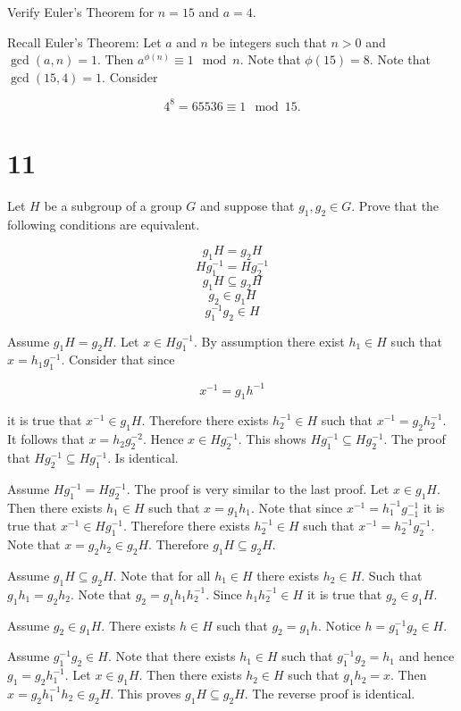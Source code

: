 \documentclass[a4paper]{article}
\begin{document}
Verify Euler's Theorem for $n=15$ and $a=4$.

\vspace{\baselineskip}

Recall Euler's Theorem: Let $a$ and $n$ be integers such that $n > 0$ and $\gcd(a,n) = 1$. Then $a^{\phi(n)} \equiv 1 \mod n$. Note that $\phi(15) = 8$. Note that $\gcd(15, 4) = 1$. Consider

$$4^8 = 65536 \equiv 1 \mod 15.$$


\section*{11}

Let $H$ be a subgroup of a group $G$ and suppose that $g_1, g_2 \in G$. Prove that the following conditions are equivalent.

$$g_1 H = g_2 H$$
$$H g_1^{-1} = H g_2^{-1}$$
$$g_1 H \subseteq g_2 H$$
$$g_2  \in g_1 H$$
$$g_1^{-1} g_2 \in H$$

\vspace{\baselineskip}

Assume $g_1 H = g_2 H$. Let $x \in H g_1^{-1}$. By assumption there exist $h_1 \in H$ such that $x = h_1 g_1^{-1}$. Consider that since

$$x^{-1} = g_1 h^{-1}$$

it is true that $x^{-1} \in g_1 H$. Therefore there exists $h_2^{-1} \in H$ such that $x^{-1} = g_2 h_2^{-1}$. It follows that $x = h_2 g_2^{-2}$. Hence $x \in H g_2^{-1}$. This shows $H g_1^{-1} \subseteq H g_2^{-1}$. The proof that $H g_2^{-1} \subseteq H g_1^{-1}$. Is identical.

Assume $Hg_1^{-1} = Hg_2^{-1}$. The proof is very similar to the last proof. Let $x \in g_1 H$. Then there exists $h_1 \in H$ such that $x = g_1 h_1$. Note that since $x^{-1} = h_1^{-1} g_{-1}^{-1}$ it is true that $x^{-1} \in H g_1^{-1}$. Therefore there exists $h_2^{-1} \in H$ such that $x^{-1} = h_2^{-1} g_2^{-1}$. Note that $x = g_2 h_2 \in g_2 H$. Therefore $g_1 H \subseteq g_2 H$.

Assume $g_1 H \subseteq g_2 H$. Note that for all $h_1 \in H$ there exists $h_2 \in H$. Such that $g_1 h_1 = g_2 h_2$. Note that $g_2 = g_1 h_1 h_2 ^{-1}$. Since $h_1 h_2^{-1} \in H$ it is true that $g_2 \in g_1 H$.

Assume $g_2  \in g_1 H$. There exists $h \in H$ such that $g_2 = g_1 h$. Notice $h = g_1^{-1} g_2 \in H$.

Assume $g_1^{-1} g_2 \in H$. Note that there exists $h_1 \in H$ such that $g_1^{-1} g_2 = h_1$ and hence $g_1 = g_2 h_1^{-1}$. Let $x \in g_1 H$. Then there exists $h_2 \in H$ such that $g_1 h_2 = x$. Then $x = g_2 h_1^{-1} h_2 \in g_2 H$. This proves $g_1 H \subseteq g_2 H$. The reverse proof is identical.
\end{document}
